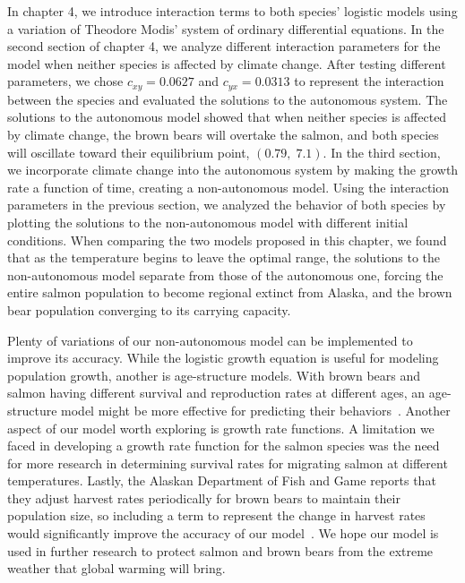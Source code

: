 In chapter 4, we introduce interaction terms to both species' logistic models using a variation of Theodore Modis' system of ordinary differential equations.
In the second section of chapter 4, we analyze different interaction parameters for the model when neither species is affected by climate change.
After testing different parameters, we chose $c_{xy} = 0.0627$ and $c_{yx} = 0.0313$ to represent the interaction between the species and evaluated the solutions to the autonomous system.
The solutions to the autonomous model showed that when neither species is affected by climate change, the brown bears will overtake the salmon, and both species will oscillate toward their equilibrium point, $(0.79,\;7.1)$.
In the third section, we incorporate climate change into the autonomous system by making the growth rate a function of time, creating a non-autonomous model.
Using the interaction parameters in the previous section,  we analyzed the behavior of both species by plotting the solutions to the non-autonomous model with different initial conditions.
When comparing the two models proposed in this chapter, we found that as the temperature begins to leave the optimal range, the solutions to the non-autonomous model separate from those of the autonomous one, forcing the entire salmon population to become regional extinct from Alaska, and the brown bear population converging to its carrying capacity.

Plenty of variations of our non-autonomous model can be implemented to improve its accuracy.
While the logistic growth equation is useful for modeling population growth, another is age-structure models.
With brown bears and salmon having different survival and reproduction rates at different ages, an age-structure model might be more effective for predicting their behaviors~\cite{daele2010management,palstra2009age}.
Another aspect of our model worth exploring is growth rate functions.
A limitation we faced in developing a growth rate function for the salmon species was the need for more research in determining survival rates for migrating salmon at different temperatures.
Lastly, the Alaskan Department of Fish and Game reports that they adjust harvest rates periodically for brown bears to maintain their population size, so including a term to represent the change in harvest rates would significantly improve the accuracy of our model~\cite{daele2010management}.
We hope our model is used in further research to protect salmon and brown bears from the extreme weather that global warming will bring.